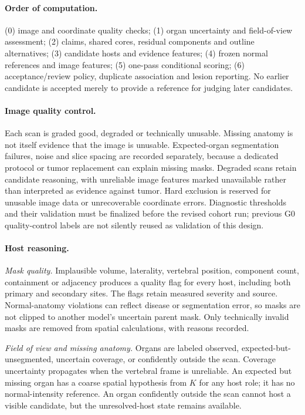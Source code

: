 \documentclass[fleqn,10pt]{olplainarticle}
\begin{document}
\paragraph{Order of computation.}
(0) image and coordinate quality checks; (1) organ uncertainty and field-of-view assessment; (2) claims, shared cores,
residual components and outline alternatives; (3) candidate hosts and evidence features; (4) frozen normal references and
image features; (5) one-pass conditional scoring; (6) acceptance/review policy, duplicate association and lesion reporting.
No earlier candidate is accepted merely to provide a reference for judging later candidates.

\paragraph{Image quality control.}
\label{sec:qc_details}
Each scan is graded good, degraded or technically unusable. Missing anatomy is not itself evidence that the image is
unusable. Expected-organ segmentation failures, noise and slice spacing are recorded separately, because a dedicated
protocol or tumor replacement can explain missing masks. Degraded scans retain candidate reasoning, with unreliable image
features marked unavailable rather than interpreted as evidence against tumor. Hard exclusion is reserved for unusable
image data or unrecoverable coordinate errors. Diagnostic thresholds and their validation must be finalized before the
revised cohort run; previous G0 quality-control labels are not silently reused as validation of this design.

\paragraph{Host reasoning.}
\label{sec:host_details}
\emph{Mask quality.} Implausible volume, laterality, vertebral position, component count, containment or adjacency produces
a quality flag for every host, including both primary and secondary sites. The flags retain measured severity and source.
Normal-anatomy violations can reflect disease or segmentation error, so masks are not clipped to another model's uncertain
parent mask. Only technically invalid masks are removed from spatial calculations, with reasons recorded.

\emph{Field of view and missing anatomy.} Organs are labeled observed, expected-but-unsegmented, uncertain coverage, or
confidently outside the scan. Coverage uncertainty propagates when the vertebral frame is unreliable. An expected but
missing organ has a coarse spatial hypothesis from $K$ for any host role; it has no normal-intensity reference. An organ
confidently outside the scan cannot host a visible candidate, but the unresolved-host state remains available.
\end{document}
